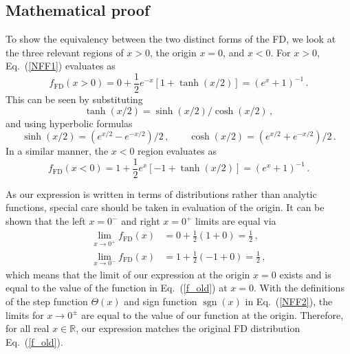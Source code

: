 \documentclass[sn-mathphys,Numbered]{sn-jnl}
\newcommand{\req}[1]{Eq.~(\ref{#1})}
\DeclareMathOperator{\sgn}{sgn}
\begin{document}
\subsection{Mathematical proof}
\label{Proof}
To show the equivalency between the two distinct forms of the FD, we look at the three relevant regions of $x>0$, the origin $x=0$, and $x<0$. For $x>0$, \req{NFF1} evaluates as
\begin{equation}
    f_\mathrm{FD}(x>0) = 0 + \frac{1}{2}e^{-x}[1+\tanh(x/2)] = (e^x + 1)^{-1}\,.
\end{equation}
This can be seen by substituting
\begin{equation}
    \tanh(x/2)=\sinh(x/2)/\cosh(x/2)\,,
\end{equation}
and using hyperbolic formulas
\begin{equation}
    \sinh(x/2)=(e^{x/2}-e^{-x/2})/2\,,\qquad
    \cosh(x/2) = (e^{x/2}+e^{-x/2})/2\,.
\end{equation}
In a similar manner, the $x<0$ region evaluates as
\begin{equation}
    f_\mathrm{FD}(x<0) = 1 + \frac{1}{2}e^{x}[-1 + \tanh(x/2)] = (e^x + 1)^{-1}\,.
\end{equation}

As our expression is written in terms of distributions rather than analytic functions, special care should be taken in evaluation of the origin. It can be shown that the left $x=0^{-}$ and right $x=0^{+}$ limits are equal via
\begin{align}
    \lim_{x\rightarrow 0^+} f_\mathrm{FD}(x) &= 0 + \frac{1}{2}(1 + 0) = \frac{1}{2}\,,\\
    \lim_{x\rightarrow 0^-} f_\mathrm{FD}(x) &= 1 + \frac{1}{2}(-1 + 0) = \frac{1}{2}\,,
\end{align}
which means that the limit of our expression at the origin $x=0$ exists and is equal to the value of the function in \req{f_old} at $x = 0$. With the definitions of the step function $\Theta(x)$ and sign function $\sgn(x)$ in \req{NFF2}, the limits for $x\rightarrow0^{\pm}$ are equal to the value of our function at the origin. Therefore, for all real $x\in\mathbb{R}$, our expression matches the original FD distribution \req{f_old}.

\end{document}
